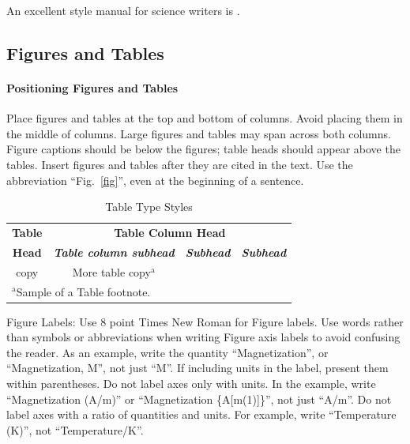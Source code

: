 \documentclass[conference]{IEEEtran}
\begin{document}
An excellent style manual for science writers is \cite{young1989technical}.

\subsection{Figures and Tables}
\paragraph{Positioning Figures and Tables} Place figures and tables at the top and
bottom of columns. Avoid placing them in the middle of columns. Large
figures and tables may span across both columns. Figure captions should be
below the figures; table heads should appear above the tables. Insert
figures and tables after they are cited in the text. Use the abbreviation
``Fig.~\ref{fig}'', even at the beginning of a sentence.

\begin{table}[htbp]
    \caption{Table Type Styles}
    \begin{center}
        \begin{tabular}{|c|c|c|c|}
            \hline
            \textbf{Table} & \multicolumn{3}{|c|}{\textbf{Table Column Head}}                                                         \\
            \cline{2-4}
            \textbf{Head}  & \textbf{\textit{Table column subhead}}           & \textbf{\textit{Subhead}} & \textbf{\textit{Subhead}} \\
            \hline
            copy           & More table copy$^{\mathrm{a}}$                   &                           &                           \\
            \hline
            \multicolumn{4}{l}{$^{\mathrm{a}}$Sample of a Table footnote.}
        \end{tabular}
        \label{tab1}
    \end{center}
\end{table}

Figure Labels: Use 8 point Times New Roman for Figure labels. Use words
rather than symbols or abbreviations when writing Figure axis labels to
avoid confusing the reader. As an example, write the quantity
``Magnetization'', or ``Magnetization, M'', not just ``M''. If including
units in the label, present them within parentheses. Do not label axes only
with units. In the example, write ``Magnetization (A/m)'' or ``Magnetization
\{A[m(1)]\}'', not just ``A/m''. Do not label axes with a ratio of
quantities and units. For example, write ``Temperature (K)'', not
``Temperature/K''.
\end{document}
